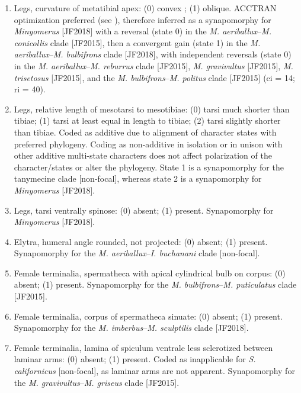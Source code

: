 \documentclass[fleqn,10pt,lineno]{wlpeerj} %
\begin{document}
\begin{enumerate}
	 	\item Legs, curvature of metatibial apex: (0) convex ; (1) oblique. ACCTRAN optimization preferred (see \citealt{agnarsson2008}), therefore inferred as a synapomorphy for \textit{Minyomerus} [JF2018] with a reversal (state 0) in the \textit{M. aeriballux}--\textit{M. conicollis} clade [JF2015], then a convergent gain (state 1) in the \textit{M. aeriballux}--\textit{M. bulbifrons} clade [JF2018], with independent reversals (state 0) in the \textit{M. aeriballux}--\textit{M. reburrus} clade [JF2015], \textit{M. gravivultus} [JF2015], \textit{M. trisetosus} [JF2015], and the \textit{M. bulbifrons}--\textit{M. politus} clade [JF2015] (ci = 14; ri = 40).
	 	
		\item Legs, relative length of mesotarsi to mesotibiae: (0) tarsi much shorter than tibiae; (1) tarsi at least equal in length to tibiae; (2) tarsi slightly shorter than tibiae. Coded as additive due to alignment of character states with preferred phylogeny. Coding as non-additive in isolation or in unison with other additive multi-state characters does not affect polarization of the character/states or alter the phylogeny. State 1 is a synapomorphy for the tanymecine clade [non-focal], whereas state 2 is a synapomorphy for \textit{Minyomerus} [JF2018].
		
		\item Legs, tarsi ventrally spinose: (0) absent; (1) present. Synapomorphy for \textit{Minyomerus} [JF2018].
		
		\item Elytra, humeral angle rounded, not projected: (0) absent; (1) present. Synapomorphy for the \textit{M. aeriballux}--\textit{I. buchanani} clade [non-focal].
		
		\item Female terminalia, spermatheca with apical cylindrical bulb on corpus: (0) absent; (1) present. Synapomorphy for the \textit{M. bulbifrons}--\textit{M. puticulatus} clade [JF2015].
		
		\item Female terminalia, corpus of spermatheca sinuate: (0) absent; (1) present. Synapomorphy for the \textit{M. imberbus}--\textit{M. sculptilis} clade [JF2018].
		
		\item Female terminalia, lamina of spiculum ventrale less sclerotized between laminar arms: (0) absent; (1) present. Coded as inapplicable for \textit{S. californicus} [non-focal], as laminar arms are not apparent. Synapomorphy for the \textit{M. gravivultus}--\textit{M. griseus} clade [JF2015].
		

\end{enumerate}
\end{document}
